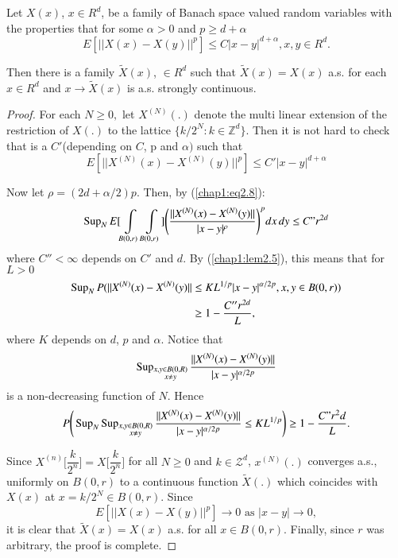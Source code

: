 \begin{lemma}\label{chap1:lem2.6} %
Let $X(x)$, $x \in R^d$, be a family of Banach space valued random
variables with the properties that for some $\alpha > 0$ and $p \geq
d+ \alpha$ 
\begin{equation*}
E[||X(x) -X(y)||^p] \leq C|x-y|^{d+ \alpha}, x, y \in
R^d. \tag{2.7}\label{chap1:eq2.7}    
\end{equation*}

Then there is a family $\tilde{X} (x)$, $\in R^d$ such that
$\tilde{X}(x)= X(x)$ a.s. for each $ x \in R^d $ and $x \to
\tilde{X}(x)$ is a.s. strongly continuous. 
\end{lemma}

\begin{proof}
For each $N \geq 0,$ let $X^{(N)}(.)$ denote the multi linear extension of
the restriction of $X(.)$ to the lattice $\{ k/2^N : k \in
\mathbb{Z}^d \}$. Then it is not hard to check that is a
$C'$(depending on $C$, p and $\alpha)$ such that  
\begin{equation*}
E[||X^{(N)} (x) - X^{(N)} (y)||^p] \leq C' |x-y|^{d+\alpha}
\tag{2.8}\label{chap1:eq2.8}   
\end{equation*}

Now let $\rho = (2d + \alpha/2)p$. Then, by (\ref{chap1:eq2.8}):
$$
\operatorname{Sup}_{N} E[ \int\limits_{B(0,r)} \int\limits_{B(0,r)}] \Bigg( 
\frac{|| X^{(N)} (x) -X^{(N)} (y)||}{|x-y|^{\rho}} \Bigg)^p dx \, dy \leq C"
r^{2d} 
$$
where $C'' < \infty$ depends on $C'$ and $d$. By (\ref{chap1:lem2.5}),
this means that for $L> 0$ 
\begin{align*}
\operatorname{Sup}_{N} P (|| X^{(N)} (x) -X^{(N)} (y)|| & \leq KL^{1/p}|x-y|^{\alpha/2p},
x,y \in B(0,r))\\ 
& \geq 1- \frac{C''r^{2d}}{L},
\end{align*}\pageoriginale
where $K$ depends on $d$, $p$ and $\alpha$. Notice that 
$$
\operatorname{Sup}_ {\substack{ x,y \in B(0,R )\\  x \neq y}}  \frac{|| X^{(N)} (x) 
  -X^{(N)} (y)||}{|x-y|^{\alpha/2p}} 
$$
is a non-decreasing function of $N$. Hence 
$$
P \Bigg( \operatorname{Sup}\limits_{N} \operatorname{Sup}\limits_{\substack{ x,y \in B(0,R )\\  x \neq 
    y}}\frac{|| X^{(N)} (x) -X^{(N)} (y)||}{|x-y|^{\alpha/2p}} \leq
KL^{1/p} \Bigg) \geq 1- \frac{C" r^2d}{L}. 
$$

Since $X^{(n)} \bigg[\dfrac{k}{2^n}\bigg] =
X\bigg[\dfrac{k}{2^n}\bigg]$ for all $N \geq 0$ and  $k \in
\mathscr{Z}^d$, $x^{(N)}(.)$ converges a.s., uniformly on $B(0,r)$
to a continuous function $\tilde{X}(.)$ which coincides with $X(x)$ at
$x = k/2^N \in B(0,r)$. Since  
$$
E[ || X(x) - X(y)||^p] \to 0 \text{ as } |x-y| \to 0, 
$$
it is clear that $\tilde{X}(x) =X(x)$ a.s. for all $x \in 
B(0,r)$. Finally, since $r$ was arbitrary, the proof is complete. 
\end{proof}


